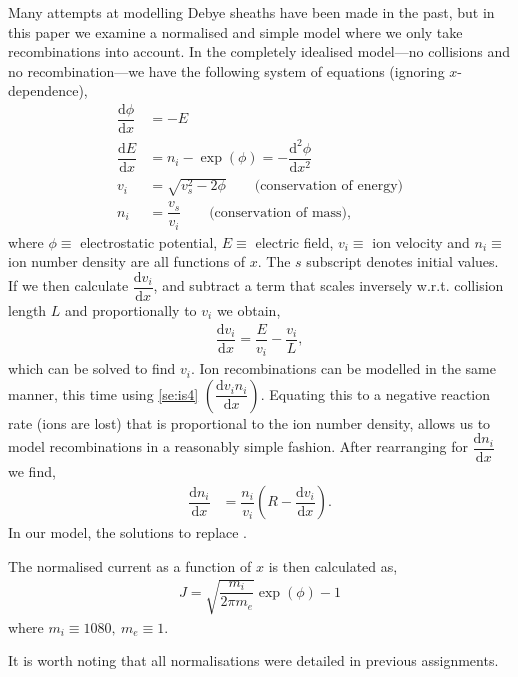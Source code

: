 \documentclass[aip,apl,reprint]{revtex4-1}
\newcommand{\difx}[1]{\dfrac{\mathrm{d}#1}{\mathrm{d}x}}
\newcommand{\ddifx}[1]{\dfrac{\mathrm{d}^{2}#1}{\mathrm{d}x^{2}}}
\begin{document}
	Many attempts at modelling Debye sheaths have been made in the past\cite{lpcs}, but in this paper we examine a normalised and simple model where we only take recombinations into account. In the completely idealised model---no collisions and no recombination---we have the following system of equations (ignoring $x$-dependence),
	\begin{subequations}
		\begin{align}
			\difx{\phi} &= -E \label{se:is1}\\
			\difx{E} &= n_{i} - \exp(\phi) = - \ddifx{\phi} \label{se:is2}\\
			v_{i} &= \sqrt{v_{s}^{2} - 2 \phi} \qquad \textrm{(conservation of energy)}\label{se:is3}\\
			n_{i} &= \dfrac{v_{s}}{v_{i}} \qquad \textrm{(conservation of mass)}\label{se:is4},
		\end{align}
	\end{subequations}
	where $\phi \equiv$ electrostatic potential, $E \equiv$ electric field, $v_{i} \equiv$ ion velocity and $n_{i} \equiv$ ion number density are all functions of $x$. The $s$ subscript denotes initial values. If we then calculate $\difx{v_{i}}$, and subtract a term that scales inversely w.r.t. collision length $L$ and proportionally to $v_{i}$ we obtain,
	\begin{align}
		\difx{v_{i}} = \dfrac{E}{v_{i}} - \dfrac{v_{i}}{L},\label{se:s3}
	\end{align}
	which can be solved to find $v_{i}$. Ion recombinations can be modelled in the same manner, this time using \cref{se:is4} $\left(\difx{v_{i} n_{i}}\right)$. Equating this to a negative reaction rate (ions are lost) that is proportional to the ion number density, allows us to model recombinations in a reasonably simple fashion. After rearranging for $\difx{n_{i}}$ we find,
	\begin{align}
		\difx{n_{i}} &= \dfrac{n_{i}}{v_{i}} \left(R - \difx{v_{i}}\right).\label{se:s4}
	\end{align}
	In our model, the solutions to  replace .
	
	The normalised current as a function of $x$ is then calculated as,
	\begin{align}
		J = \sqrt{\dfrac{m_{i}}{2\pi m_{e}}} \exp(\phi) - 1 \label{s:curr}
	\end{align}
	where $m_{i} \equiv 1080,~m_{e} \equiv 1$.
	
	It is worth noting that all normalisations were detailed in previous assignments.
\end{document}
